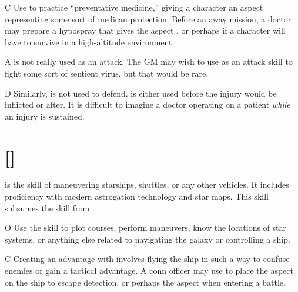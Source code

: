 \documentclass[12pt,titlepage,openany]{book}
\begin{document}
\begin{NewSkillAction}{C}
    Use  to practice ``preventative medicine,'' giving a
    character an aspect representing some sort of medican protection. Before an
    away mission, a doctor may prepare a hypospray that gives the aspect
    , or perhaps  if a character will have to survive in a high-altitude environment.
\end{NewSkillAction}

\begin{NewSkillAction}{A}
     is not really used as an attack. The GM may wish to use
     as an attack skill to fight some sort of sentient virus,
    but that would be rare.
\end{NewSkillAction}

\begin{NewSkillAction}{D}
    Similarly,  is not used to defend.  is
    either used before the injury would be inflicted or after. It is difficult
    to imagine a doctor operating on a patient \emph{while} an injury is
    sustained.
\end{NewSkillAction}

\section{ []}\label{sec:pilot}
 is the skill of maneuvering starships, shuttles, or any other
vehicles. It includes proficiency with modern astrogation technology and star
maps. This skill subsumes the  skill from \FateCore{}.

\vspace{1ex}

\begin{NewSkillAction}{O}
    Use the  skill to plot courses, perform maneuvers, know the
    locations of star systems, or anything else related to navigating the
    galaxy or controlling a ship.
\end{NewSkillAction}

\begin{NewSkillAction}{C}
    Creating an advantage with  involves flying the ship in such a
    way to confuse enemies or gain a tactical advantage. A conn officer may use
     to place the aspect  on the ship
    to escape detection, or perhaps the aspect 
    when entering a battle.
\end{NewSkillAction}
\end{document}
